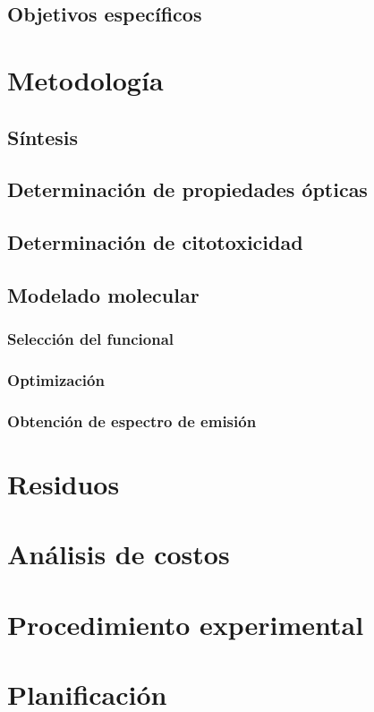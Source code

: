 \documentclass[spanish,mexico]{scrartcl}
\begin{document}
\subsection{Objetivos específicos}
\section{Metodología}
\subsection{Síntesis}
\subsection{Determinación de propiedades ópticas}
\subsection{Determinación de citotoxicidad}
\subsection{Modelado molecular}
\subsubsection{Selección del funcional}
\subsubsection{Optimización}
\subsubsection{Obtención de espectro de emisión}
\section{Residuos}
\section{Análisis de costos}
\section{Procedimiento experimental}
\section{Planificación}

\printreactants{}
\printglossaries{}
\printbibliography{}

\listoftodos[Pendientes]
\end{document}
